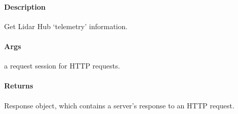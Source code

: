 \documentclass[letterpaper,10pt,english]{sphinxmanual}
\begin{document}
\begin{fulllineitems}
\label{\detokenize{gemini_lidar_hub_API:gemini_lidar_hub_API.get_lidar_hub_telemetry}}
\pysigstartsignatures
{}
\pysigstopsignatures

\paragraph{Description}
\label{\detokenize{gemini_lidar_hub_API:id32}}
\sphinxAtStartPar
Get Lidar Hub ‘telemetry’ information.


\paragraph{Args}
\label{\detokenize{gemini_lidar_hub_API:id33}}\begin{description}
\sphinxAtStartPar
a request session for HTTP requests.

\end{description}


\paragraph{Returns}
\label{\detokenize{gemini_lidar_hub_API:id34}}\begin{description}
\sphinxAtStartPar
Response object, which contains a server’s response to an HTTP request.

\end{description}

\end{fulllineitems}

\end{document}

